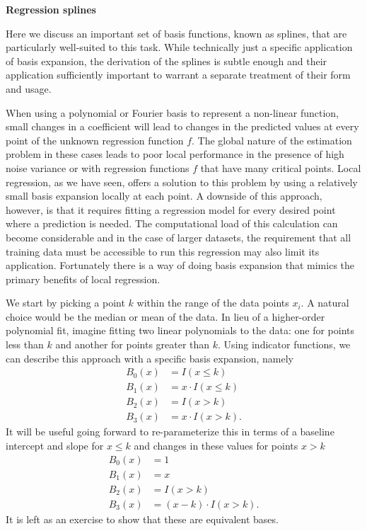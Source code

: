 \documentclass[12pt,hidelinks]{article}
\numberwithin{equation}{section}
\begin{document}
\textbf{Regression splines}

Here we discuss an important set of basis functions, known
as splines, that are particularly well-suited to this task. While technically
just a specific application of basis expansion, the derivation of the
splines is subtle enough and their application sufficiently important to
warrant a separate treatment of their form and usage.

When using a polynomial or Fourier basis to represent a non-linear function,
small changes in a coefficient will lead to changes in the predicted values
at every point of the unknown regression function $f$. The global nature
of the estimation problem in these cases leads to poor local performance
in the presence of high noise variance or with regression functions $f$
that have many critical points. Local regression, as we have seen, offers
a solution to this problem by using a relatively small basis expansion
locally at each point. A downside of this approach, however, is that it
requires fitting a regression model for every desired point where a
prediction is needed. The computational load of this calculation can
become considerable and in the case of larger datasets, the requirement
that all training data must be accessible to run this regression may also
limit its application. Fortunately there is a way of doing basis
expansion that mimics the primary benefits of local regression.

We start by picking a point $k$ within the range of the data points $x_i$.
A natural choice would be the median or mean of the data. In lieu of
a higher-order polynomial fit, imagine fitting two linear polynomials
to the data: one for points less than $k$ and another for points greater
than $k$. Using indicator functions, we can describe this approach
with a specific basis expansion, namely
\begin{align}
B_0(x) &= I(x \leq k) \\
B_1(x) &= x \cdot I(x \leq k) \\
B_2(x) &= I(x > k) \\
B_3(x) &= x \cdot I(x > k).
\end{align}
It will be useful going forward to re-parameterize this in terms of a
baseline intercept and slope for $x \leq k$ and changes in these values
for points $x > k$
\begin{align}
B_0(x) &= 1 \label{tp_basis_orig_start} \\
B_1(x) &= x \\
B_2(x) &= I(x > k) \\
B_3(x) &= (x - k) \cdot I(x > k). \label{tp_basis_orig_end}
\end{align}
It is left as an exercise to show that these are equivalent bases.
\end{document}
